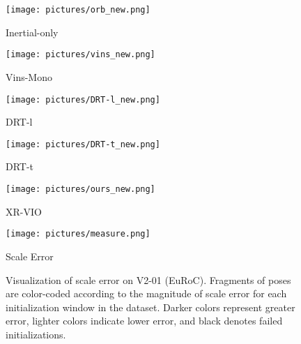 
\begin{figure*}[h]
    \centering
    \begin{minipage}[t]{0.183\textwidth}
        \centering
        \texttt{[image: pictures/orb\_new.png]} %
        \parbox{\textwidth}{\centering Inertial-only}
    \end{minipage}%
    \begin{minipage}[t]{0.183\textwidth}
        \centering
        \texttt{[image: pictures/vins\_new.png]} %
        \parbox{\textwidth}{\centering Vins-Mono}
    \end{minipage}%
    \begin{minipage}[t]{0.183\textwidth}
        \centering
        \texttt{[image: pictures/DRT-l\_new.png]} %
        \parbox{\textwidth}{\centering DRT-l}
    \end{minipage}%
    \begin{minipage}[t]{0.183\textwidth}
        \centering
        \texttt{[image: pictures/DRT-t\_new.png]} %
        \parbox{\textwidth}{\centering DRT-t}
    \end{minipage}%
    \begin{minipage}[t]{0.183\textwidth}
        \centering
        \texttt{[image: pictures/ours\_new.png]} %
        \parbox{\textwidth}{\centering XR-VIO}
    \end{minipage}%
    \begin{minipage}[t]{0.055\textwidth}
        \centering
        \begin{minipage}[t]{1\textwidth}
            \centering
            \texttt{[image: pictures/measure.png]} %
            \parbox{\textwidth}{\centering Scale Error }
        \end{minipage}
    \end{minipage}%
    \caption{Visualization of scale error on V2-01 (EuRoC). Fragments of poses are color-coded according to the magnitude of scale error for each initialization window in the dataset. Darker colors represent greater error, lighter colors indicate lower error, and black denotes failed initializations.}
    \label{fig:Trajectory-Visual-Init}
\end{figure*}

